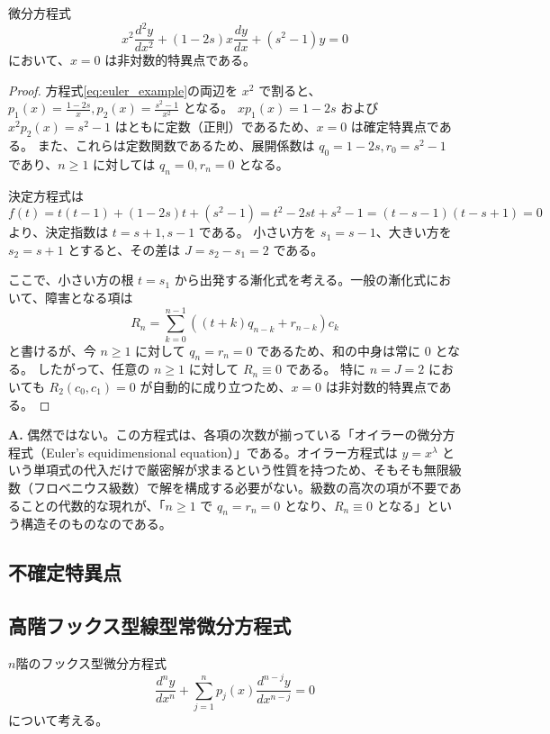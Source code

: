 \begin{example}
微分方程式
\begin{equation}\label{eq:euler_example}
x^{2}\frac{d^{2}y}{dx^{2}} + (1-2s)x\frac{dy}{dx} + (s^{2}-1)y = 0
\end{equation}
において、$x=0$ は非対数的特異点である。
\end{example}

\begin{proof}
方程式\eqref{eq:euler_example}の両辺を $x^2$ で割ると、$p_{1}(x) = \frac{1-2s}{x}, p_{2}(x) = \frac{s^{2}-1}{x^{2}}$ となる。
$x p_{1}(x) = 1-2s$ および $x^{2} p_{2}(x) = s^{2}-1$ はともに定数（正則）であるため、$x=0$ は確定特異点である。
また、これらは定数関数であるため、展開係数は $q_{0} = 1-2s, r_{0} = s^{2}-1$ であり、$n \ge 1$ に対しては $q_{n} = 0, r_{n} = 0$ となる。

決定方程式は
\[
f(t) = t(t-1) + (1-2s)t + (s^{2}-1) = t^{2} - 2st + s^{2} - 1 = (t-s-1)(t-s+1) = 0
\]
より、決定指数は $t = s+1, s-1$ である。
小さい方を $s_{1} = s-1$、大きい方を $s_{2} = s+1$ とすると、その差は $J = s_{2} - s_{1} = 2$ である。

ここで、小さい方の根 $t=s_{1}$ から出発する漸化式を考える。一般の漸化式において、障害となる項は
\[
R_{n} = \sum_{k=0}^{n-1} \left( (t+k)q_{n-k} + r_{n-k} \right) c_{k}
\]
と書けるが、今 $n \ge 1$ に対して $q_{n} = r_{n} = 0$ であるため、和の中身は常に $0$ となる。
したがって、任意の $n \ge 1$ に対して $R_{n} \equiv 0$ である。
特に $n = J = 2$ においても $R_{2}(c_{0}, c_{1}) = 0$ が自動的に成り立つため、$x=0$ は非対数的特異点である。
\end{proof}

\begin{Q}
\textbf{A.} 偶然ではない。この方程式は、各項の次数が揃っている「オイラーの微分方程式（Euler's equidimensional equation）」である。オイラー方程式は $y = x^{\lambda}$ という単項式の代入だけで厳密解が求まるという性質を持つため、そもそも無限級数（フロベニウス級数）で解を構成する必要がない。級数の高次の項が不要であることの代数的な現れが、「$n \ge 1$ で $q_n=r_n=0$ となり、$R_n \equiv 0$ となる」という構造そのものなのである。
\end{Q}

\subsection{不確定特異点}

\subsection{高階フックス型線型常微分方程式}
$n$階のフックス型微分方程式
\begin{equation}\label{eq:linear-ode-n}
    \frac{d^{n}y}{dx^{n}}+\sum_{j=1}^{n} p_{j}(x)\frac{d^{n-j}y}{dx^{n-j}} = 0   
\end{equation}
について考える。

